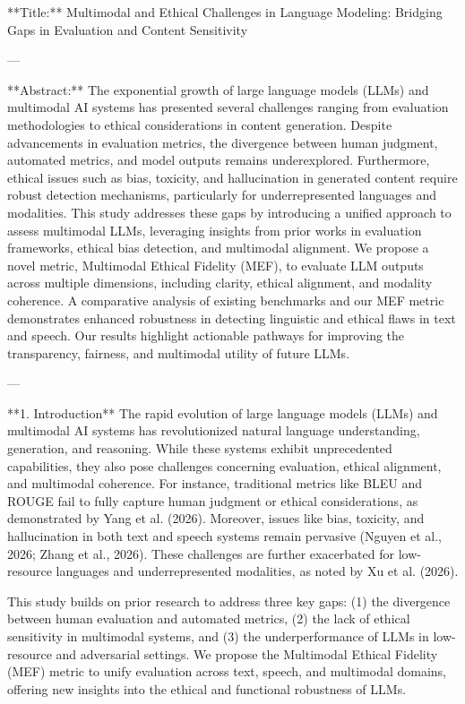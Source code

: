 **Title:** Multimodal and Ethical Challenges in Language Modeling: Bridging Gaps in Evaluation and Content Sensitivity  

---

**Abstract:**  
The exponential growth of large language models (LLMs) and multimodal AI systems has presented several challenges ranging from evaluation methodologies to ethical considerations in content generation. Despite advancements in evaluation metrics, the divergence between human judgment, automated metrics, and model outputs remains underexplored. Furthermore, ethical issues such as bias, toxicity, and hallucination in generated content require robust detection mechanisms, particularly for underrepresented languages and modalities. This study addresses these gaps by introducing a unified approach to assess multimodal LLMs, leveraging insights from prior works in evaluation frameworks, ethical bias detection, and multimodal alignment. We propose a novel metric, Multimodal Ethical Fidelity (MEF), to evaluate LLM outputs across multiple dimensions, including clarity, ethical alignment, and modality coherence. A comparative analysis of existing benchmarks and our MEF metric demonstrates enhanced robustness in detecting linguistic and ethical flaws in text and speech. Our results highlight actionable pathways for improving the transparency, fairness, and multimodal utility of future LLMs.

---

**1. Introduction**  
The rapid evolution of large language models (LLMs) and multimodal AI systems has revolutionized natural language understanding, generation, and reasoning. While these systems exhibit unprecedented capabilities, they also pose challenges concerning evaluation, ethical alignment, and multimodal coherence. For instance, traditional metrics like BLEU and ROUGE fail to fully capture human judgment or ethical considerations, as demonstrated by Yang et al. (2026). Moreover, issues like bias, toxicity, and hallucination in both text and speech systems remain pervasive (Nguyen et al., 2026; Zhang et al., 2026). These challenges are further exacerbated for low-resource languages and underrepresented modalities, as noted by Xu et al. (2026).

This study builds on prior research to address three key gaps: (1) the divergence between human evaluation and automated metrics, (2) the lack of ethical sensitivity in multimodal systems, and (3) the underperformance of LLMs in low-resource and adversarial settings. We propose the Multimodal Ethical Fidelity (MEF) metric to unify evaluation across text, speech, and multimodal domains, offering new insights into the ethical and functional robustness of LLMs.

